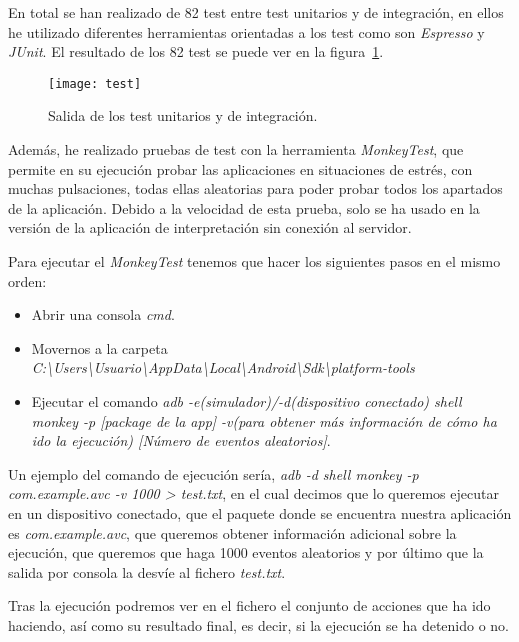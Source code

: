En total se han realizado de 82 test entre test unitarios y de integración, en ellos he utilizado diferentes herramientas orientadas a los test como son \textit{Espresso} y \textit{JUnit}. El resultado de los 82 test se puede ver en la figura~\ref{fig:test}.
\begin{figure}
	\centering
	\texttt{[image: test]}
	\caption{Salida de los test unitarios y de integración.}
	\label{fig:test}
\end{figure}

Además, he realizado pruebas de test con la herramienta \textit{MonkeyTest}, que permite en su ejecución probar las aplicaciones en situaciones de estrés, con muchas pulsaciones, todas ellas aleatorias para poder probar todos los apartados de la aplicación. Debido a la velocidad de esta prueba, solo se  ha usado en la versión de la aplicación de interpretación sin conexión al servidor.

Para ejecutar el \textit{MonkeyTest} tenemos que hacer los siguientes pasos en el mismo orden:
\begin{itemize}
	\item Abrir una consola \textit{cmd}.
	\item Movernos a la carpeta \textit{C:\textbackslash Users\textbackslash Usuario\textbackslash AppData\textbackslash Local\textbackslash Android\textbackslash Sdk\textbackslash platform-tools}
	\item Ejecutar el comando \textit{adb -e(simulador)/-d(dispositivo conectado) shell monkey -p [package de la app] -v(para obtener más información de cómo ha ido la ejecución) [Número de eventos aleatorios]}.
\end{itemize}

Un ejemplo del comando de ejecución sería, \textit{adb -d shell monkey -p com.example.avc -v 1000 > test.txt}, en el cual decimos que lo queremos ejecutar en un dispositivo conectado, que el paquete donde se encuentra nuestra aplicación es \textit{com.example.avc}, que queremos obtener información adicional sobre la ejecución, que queremos que haga 1000 eventos aleatorios y por último que la salida por consola la desvíe al fichero \textit{test.txt}.

Tras la ejecución podremos ver en el fichero el conjunto de acciones que ha ido haciendo, así como su resultado final, es decir, si la ejecución se ha detenido o no.